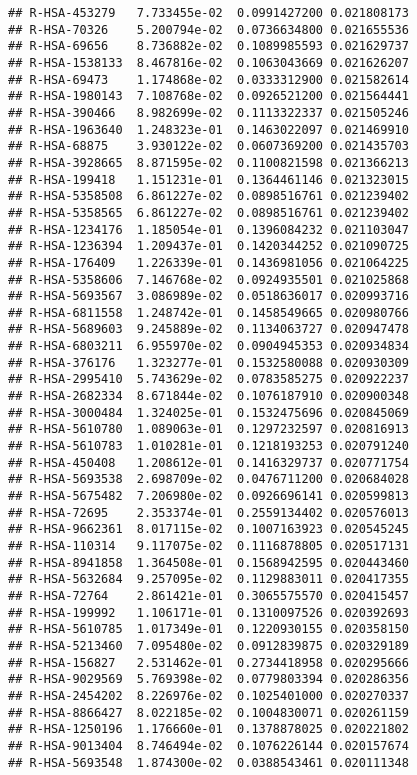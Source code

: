\documentclass[
]{article}
\begin{document}
\begin{verbatim}
## R-HSA-453279   7.733455e-02  0.0991427200 0.021808173
## R-HSA-70326    5.200794e-02  0.0736634800 0.021655536
## R-HSA-69656    8.736882e-02  0.1089985593 0.021629737
## R-HSA-1538133  8.467816e-02  0.1063043669 0.021626207
## R-HSA-69473    1.174868e-02  0.0333312900 0.021582614
## R-HSA-1980143  7.108768e-02  0.0926521200 0.021564441
## R-HSA-390466   8.982699e-02  0.1113322337 0.021505246
## R-HSA-1963640  1.248323e-01  0.1463022097 0.021469910
## R-HSA-68875    3.930122e-02  0.0607369200 0.021435703
## R-HSA-3928665  8.871595e-02  0.1100821598 0.021366213
## R-HSA-199418   1.151231e-01  0.1364461146 0.021323015
## R-HSA-5358508  6.861227e-02  0.0898516761 0.021239402
## R-HSA-5358565  6.861227e-02  0.0898516761 0.021239402
## R-HSA-1234176  1.185054e-01  0.1396084232 0.021103047
## R-HSA-1236394  1.209437e-01  0.1420344252 0.021090725
## R-HSA-176409   1.226339e-01  0.1436981056 0.021064225
## R-HSA-5358606  7.146768e-02  0.0924935501 0.021025868
## R-HSA-5693567  3.086989e-02  0.0518636017 0.020993716
## R-HSA-6811558  1.248742e-01  0.1458549665 0.020980766
## R-HSA-5689603  9.245889e-02  0.1134063727 0.020947478
## R-HSA-6803211  6.955970e-02  0.0904945353 0.020934834
## R-HSA-376176   1.323277e-01  0.1532580088 0.020930309
## R-HSA-2995410  5.743629e-02  0.0783585275 0.020922237
## R-HSA-2682334  8.671844e-02  0.1076187910 0.020900348
## R-HSA-3000484  1.324025e-01  0.1532475696 0.020845069
## R-HSA-5610780  1.089063e-01  0.1297232597 0.020816913
## R-HSA-5610783  1.010281e-01  0.1218193253 0.020791240
## R-HSA-450408   1.208612e-01  0.1416329737 0.020771754
## R-HSA-5693538  2.698709e-02  0.0476711200 0.020684028
## R-HSA-5675482  7.206980e-02  0.0926696141 0.020599813
## R-HSA-72695    2.353374e-01  0.2559134402 0.020576013
## R-HSA-9662361  8.017115e-02  0.1007163923 0.020545245
## R-HSA-110314   9.117075e-02  0.1116878805 0.020517131
## R-HSA-8941858  1.364508e-01  0.1568942595 0.020443460
## R-HSA-5632684  9.257095e-02  0.1129883011 0.020417355
## R-HSA-72764    2.861421e-01  0.3065575570 0.020415457
## R-HSA-199992   1.106171e-01  0.1310097526 0.020392693
## R-HSA-5610785  1.017349e-01  0.1220930155 0.020358150
## R-HSA-5213460  7.095480e-02  0.0912839875 0.020329189
## R-HSA-156827   2.531462e-01  0.2734418958 0.020295666
## R-HSA-9029569  5.769398e-02  0.0779803394 0.020286356
## R-HSA-2454202  8.226976e-02  0.1025401000 0.020270337
## R-HSA-8866427  8.022185e-02  0.1004830071 0.020261159
## R-HSA-1250196  1.176660e-01  0.1378878025 0.020221802
## R-HSA-9013404  8.746494e-02  0.1076226144 0.020157674
## R-HSA-5693548  1.874300e-02  0.0388543461 0.020111348

\end{verbatim}
\end{document}
